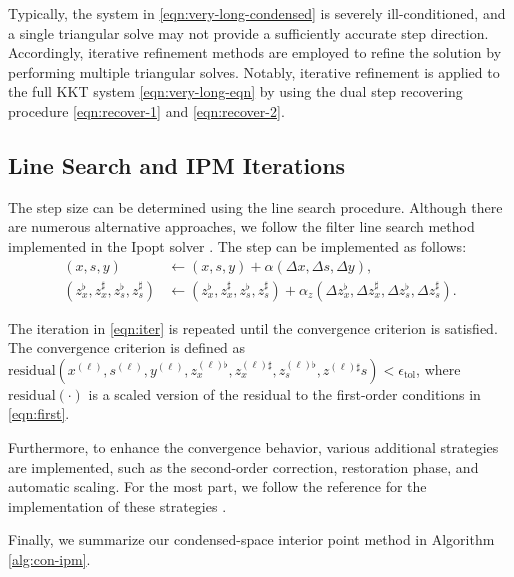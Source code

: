 Typically, the system in \eqref{eqn:very-long-condensed} is
severely ill-conditioned, and a single triangular solve may not
provide a sufficiently accurate step direction. Accordingly, iterative
refinement methods are employed to refine the solution by performing
multiple triangular solves. Notably, iterative refinement is applied
to the full KKT system \eqref{eqn:very-long-eqn} by using the dual step
recovering procedure \eqref{eqn:recover-1} and \eqref{eqn:recover-2}.

\subsection{Line Search and IPM Iterations}

The step size can be determined using the line search
procedure. Although there are numerous alternative approaches, we
follow the filter line search method implemented in the Ipopt solver
\cite{wachter2006implementation}. The step can be implemented as follows:
\begin{align}
  (x,s,y) &\leftarrow (x,s,y)+ \alpha (\Delta x, \Delta s, \Delta y),\label{eqn:iter}\\\nonumber
  (z_x^\flat, z_x^\sharp, z_s^\flat, z_s^\sharp) &\leftarrow (z_x^\flat, z_x^\sharp, z_s^\flat, z_s^\sharp) + \alpha_z (\Delta z_x^\flat, \Delta z_x^\sharp, \Delta z_s^\flat, \Delta z_s^\sharp).
\end{align}

The iteration in \eqref{eqn:iter} is repeated until the convergence
criterion is satisfied. The convergence criterion is defined as
$\text{residual}(x^{(\ell)}, s^{(\ell)}, y^{(\ell)},
z^{(\ell)\flat}_x, z^{(\ell)\sharp}_x, z^{(\ell)\flat}_s,
z^{(\ell)\sharp}s) <\epsilon_{\text{tol}}$, where
$\text{residual}(\cdot)$ is a scaled version of the residual to the
first-order conditions in \eqref{eqn:first}.

Furthermore, to enhance the convergence behavior, various additional
strategies are implemented, such as the second-order correction,
restoration phase, and automatic scaling. For the most part, we follow
the reference for the implementation of these strategies
\cite{wachter2006implementation}.

Finally, we summarize our condensed-space interior point method in
Algorithm \ref{alg:con-ipm}.

